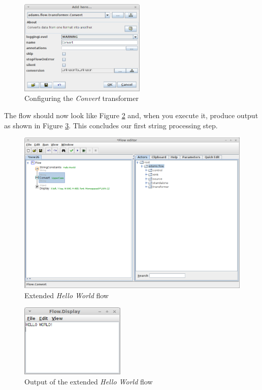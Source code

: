 \begin{figure}[htb]
  \centering
  \includegraphics[width=6.0cm]{images/floweditor-helloworld-processdata3.png}
  \caption{Configuring the \textit{Convert} transformer}
  \label{floweditor-helloworld-processdata3}
\end{figure}

The flow should now look like Figure \ref{floweditor-helloworld-processdata4}
and, when you execute it, produce output as shown in Figure
\ref{floweditor-helloworld-processdata5}. This concludes our first
string processing step.

\begin{figure}[htb]
  \centering
  \includegraphics[width=12.0cm]{images/floweditor-helloworld-processdata4.png}
  \caption{Extended \textit{Hello World} flow}
  \label{floweditor-helloworld-processdata4}
\end{figure}

\begin{figure}[htb]
  \centering
  \includegraphics[width=5.0cm]{images/floweditor-helloworld-processdata5.png}
  \caption{Output of the extended \textit{Hello World} flow}
  \label{floweditor-helloworld-processdata5}
\end{figure}

